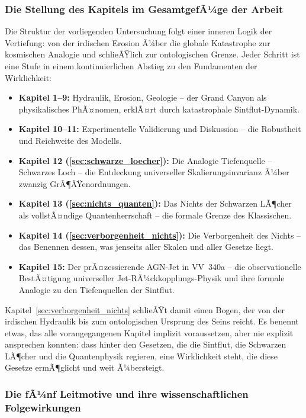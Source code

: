 ﻿\documentclass[12pt,a4paper]{report}
\begin{document}
\subsubsection{Die Stellung des Kapitels im GesamtgefÃ¼ge der Arbeit}

Die Struktur der vorliegenden Untersuchung folgt einer inneren Logik der Vertiefung: von der irdischen Erosion Ã¼ber die globale Katastrophe zur kosmischen Analogie und schlieÃŸlich zur ontologischen Grenze. Jeder Schritt ist eine Stufe in einem kontinuierlichen Abstieg zu den Fundamenten der Wirklichkeit:

\begin{itemize}
	\item \textbf{Kapitel 1--9:} Hydraulik, Erosion, Geologie -- der Grand Canyon als physikalisches PhÃ¤nomen, erklÃ¤rt durch katastrophale Sintflut-Dynamik.
	\item \textbf{Kapitel 10--11:} Experimentelle Validierung und Diskussion -- die Robustheit und Reichweite des Modells.
	\item \textbf{Kapitel 12 (\ref{sec:schwarze_loecher}):} Die Analogie Tiefenquelle -- Schwarzes Loch -- die Entdeckung universeller Skalierungsinvarianz Ã¼ber zwanzig GrÃ¶ÃŸenordnungen.
	\item \textbf{Kapitel 13 (\ref{sec:nichts_quanten}):} Das Nichts der Schwarzen LÃ¶cher als vollstÃ¤ndige Quantenherrschaft -- die formale Grenze des Klassischen.
	\item \textbf{Kapitel 14 (\ref{sec:verborgenheit_nichts}):} Die Verborgenheit des Nichts -- das Benennen dessen, was jenseits aller Skalen und aller Gesetze liegt.
	\item \textbf{Kapitel 15:} Der prÃ¤zessierende AGN-Jet in VV~340a -- die observationelle BestÃ¤tigung universeller Jet-RÃ¼ckkopplungs-Physik und ihre formale Analogie zu den Tiefenquellen der Sintflut.
\end{itemize}

Kapitel~\ref{sec:verborgenheit_nichts} schlieÃŸt damit einen Bogen, der von der irdischen Hydraulik bis zum ontologischen Ursprung des Seins reicht. Es benennt etwas, das alle vorangegangenen Kapitel implizit voraussetzen, aber nie explizit ansprechen konnten: dass hinter den Gesetzen, die die Sintflut, die Schwarzen LÃ¶cher und die Quantenphysik regieren, eine Wirklichkeit steht, die diese Gesetze ermÃ¶glicht und weit Ã¼bersteigt.

\subsubsection{Die fÃ¼nf Leitmotive und ihre wissenschaftlichen Folgewirkungen}
\end{document}
